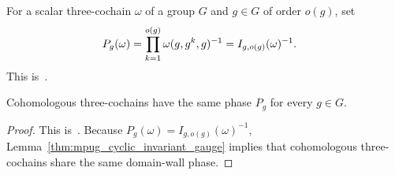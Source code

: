 \begin{definition}
    \label{def:asymex_group_cocycle_domain_wall_phase}
    \leanok
    For a scalar three-cochain $\omega$ of a group $G$ and $g\in G$ of order
    $o(g)$, set
    \begin{align}
        P_g(\omega) & =\prod_{k=1}^{o(g)}\omega(g,g^k,g)^{-1}
        =I_{g,o(g)}(\omega)^{-1}.
        \notag
    \end{align}
    This is~\cite[``The domain-wall phase'']{QICLean2026Blueprint}.
\end{definition}

\begin{lemma}
    \label{thm:asymex_group_cocycle_domain_wall_phase_gauge}
    \leanok
    Cohomologous three-cochains have the same phase $P_g$ for every $g\in G$.
\end{lemma}

\begin{proof}
    \leanok
    This is~\cite[``Gauge invariance of the domain-wall
        phase'']{QICLean2026Blueprint}.
    Because $P_g(\omega)=I_{g,o(g)}(\omega)^{-1}$,
    Lemma~\ref{thm:mpug_cyclic_invariant_gauge} implies that cohomologous
    three-cochains share the same domain-wall phase.
\end{proof}

